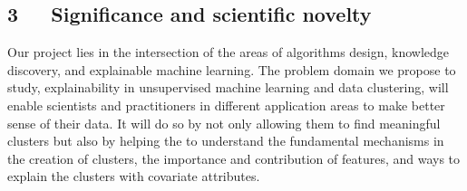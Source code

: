 \documentclass[a4paper,11pt]{article}
\begin{document}



\subsection*{3~~~Significance and scientific novelty}


 Our project lies in the intersection of the areas of  
algorithms design, knowledge discovery, and explainable machine learning.
The problem domain we propose to study, 
explainability in unsupervised machine learning and data clustering, 
will enable scientists and practitioners in  different application areas to 
make better sense of their data. 
It will do so by not only allowing them to find meaningful clusters
but also by helping the to understand the fundamental mechanisms in the creation of clusters, 
the importance and contribution of features, and ways to explain the clusters
with covariate attributes.
\end{document}
